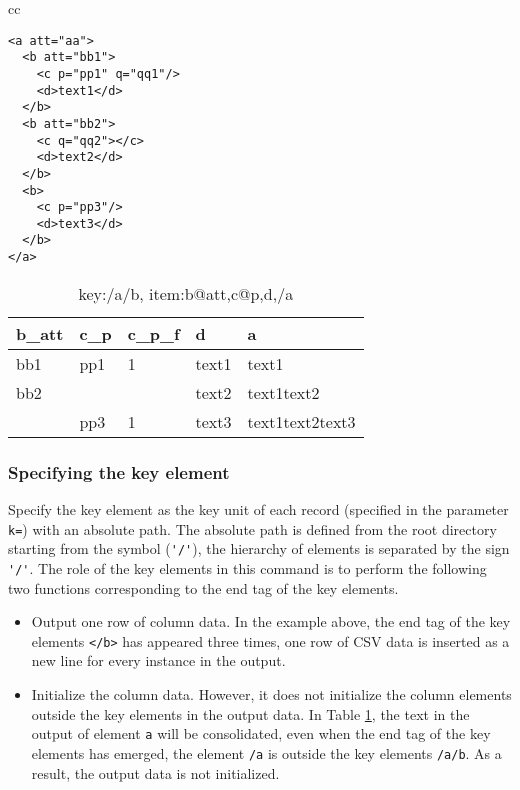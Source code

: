 \begin{table}[htbp]
\begin{center}
\begin{tabular}{cc}

\begin{minipage}{0.4\hsize}
\caption{input XML data\label{tbl:mxml2csv_input}}
\begin{verbatim}
<a att="aa">
  <b att="bb1">
    <c p="pp1" q="qq1"/>
    <d>text1</d>
  </b>
  <b att="bb2">
    <c q="qq2"></c>
    <d>text2</d>
  </b>
  <b>
    <c p="pp3"/>
    <d>text3</d>
  </b>
</a>
\end{verbatim}
\end{minipage}

\begin{minipage}{0.4\hsize}
\begin{center}
\caption{key:/a/b, item:b@att,c@p,d,/a\label{tbl:mxml2csv_out1}}
{\small
\begin{tabular}{lllll}
\hline
b\_att&c\_p&c\_p\_f&d&a \\
\hline
bb1&pp1&1&text1&text1 \\
bb2&&&text2&text1text2 \\
&pp3&1&text3&text1text2text3 \\

\hline

\end{tabular}
}
\end{center}
\end{minipage}

\end{tabular}
\end{center}
\end{table}

\subsubsection*{Specifying the key element}
Specify the key element as the key unit of each record  (specified in the parameter \verb|k=|) with an absolute path.
The absolute path is defined from the root directory starting from the symbol (\verb|'/'|), the hierarchy of elements is separated by the sign \verb|'/'|. The role of the key elements in this command is to perform the following two functions corresponding to the end tag of the key elements.

\begin{itemize}
\item Output one row of column data. In the example above, the end tag of the key elements \verb|</b>|  has appeared three times, one row of CSV data is inserted as a new line for every instance in the output.

\item Initialize the column data. However, it does not initialize the column elements outside the key elements in the output data.
In Table \ref{tbl:mxml2csv_out1},  the text in the output of element \verb|a| will be consolidated, even when the end tag of the key elements has emerged, the element \verb|/a| is outside the key elements \verb|/a/b|. As a result, the output data is not initialized.
\end{itemize}

